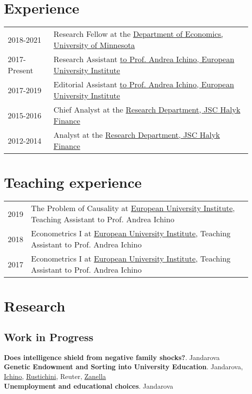 \documentclass[a4, 11pt]{article}
\begin{document}
    \section*{Experience}
  \begin{table}[H]
      \begin{tabular}{p{2cm}p{14cm}}
          2018-2021 & Research Fellow at the \href{https://cla.umn.edu/economics}{Department of Economics, University of Minnesota} \\
          2017-Present & Research Assistant \href{https://www.eui.eu}{to Prof. Andrea Ichino, European University Institute} \\
          2017-2019 & Editorial Assistant \href{https://www.eui.eu}{to Prof. Andrea Ichino, European University Institute} \\
          2015-2016 & Chief Analyst at the \href{https://www.halykfinance.kz}{Research Department, JSC Halyk Finance} \\
          2012-2014 & Analyst at the \href{https://www.halykfinance.kz}{Research Department, JSC Halyk Finance} \\
      \end{tabular}
    \end{table}


    \section*{Teaching experience}
  \begin{table}[H]
      \begin{tabular}{p{2cm}p{14cm}}
          2019 & {The Problem of Causality} at \href{https://www.eui.eu}{European University Institute}, Teaching Assistant to Prof. Andrea Ichino\\
          2018 & {Econometrics I} at \href{https://www.eui.eu}{European University Institute}, Teaching Assistant to Prof. Andrea Ichino\\
          2017 & {Econometrics I} at \href{https://www.eui.eu}{European University Institute}, Teaching Assistant to Prof. Andrea Ichino\\
      \end{tabular}
    \end{table}


    \section*{Research}\subsection*{Work in Progress}
      \textbf{Does intelligence shield from negative family shocks?}. Jandarova\\
      \textbf{Genetic Endowment and Sorting into University Education}. Jandarova, \href{http://www.andreaichino.it}{Ichino}, \href{https://sites.google.com/site/aldorustichini/}{Rustichini}, Reuter, \href{https://sites.google.com/site/giuliozanella/}{Zanella}\\
      \textbf{Unemployment and educational choices}. Jandarova\\
\end{document}
